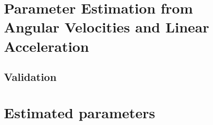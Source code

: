 \section{Parameter Estimation from Angular Velocities and Linear Acceleration}

\subsection{Validation}

\section{Estimated parameters}